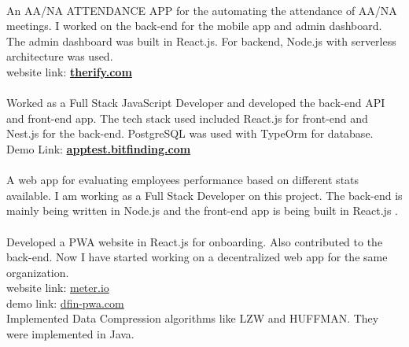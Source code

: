 \documentclass[draft=false]{deedy-resume-openfont}
\begin{document}
\begin{minipage}[t]{0.58\textwidth}
\\An AA/NA ATTENDANCE APP for the automating the attendance of AA/NA meetings. I worked on the back-end for the mobile app and admin dashboard. The admin dashboard was built in React.js. For backend, Node.js with serverless architecture was used. \\
\vspace{0.2cm}
website link: \href{http://therify.com/}{\bf therify.com} \\
\vspace{0.2cm}
\\ Worked as a Full Stack JavaScript Developer and developed the back-end API and front-end app. The tech stack used included React.js for front-end and Nest.js for the back-end. PostgreSQL was used with TypeOrm for database.\\
Demo Link: \href{https://apptest.bitfinding.com}{\bf apptest.bitfinding.com}\\
\vspace{0.2cm}
\\ A web app for evaluating employees performance based on different stats available. I am working as a Full Stack Developer on this project. The back-end is mainly being written in Node.js and the front-end app is being built in React.js .\\
\vspace{0.2cm}
\\ Developed a PWA website in React.js for onboarding. Also contributed to the back-end. Now I have started working on a decentralized web app for the same organization. \\
website link: \href{https://www.meter.io/}{meter.io}\\
demo link: \href{http://dfinlab.s3-website-us-east-1.amazonaws.com/registration}{dfin-pwa.com}\\
\vspace{0.2cm}
 Implemented Data Compression algorithms like LZW and HUFFMAN. They were implemented in Java.
\sectionsep

\end{minipage} 
\end{document}
